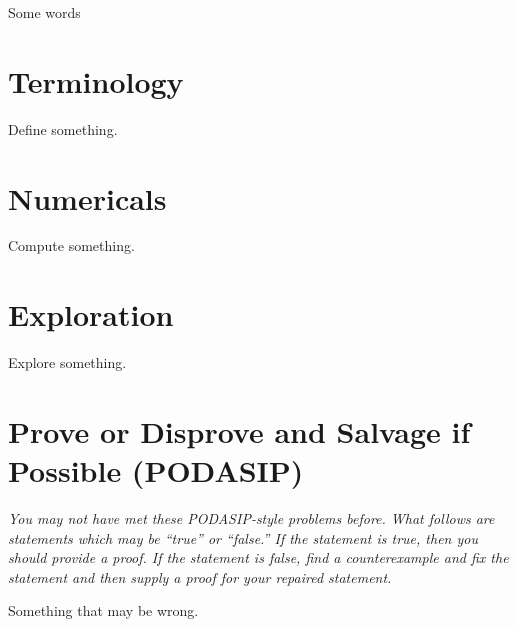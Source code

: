 \documentclass{homework}
\author{Jim Fowler}
\begin{document}
\maketitle

\begin{inspiration}
  Some words
\end{inspiration}

\section{Terminology}

\begin{problem}
  Define something.
\end{problem}

\section{Numericals}

\begin{problem}
  Compute something.
\end{problem}

\section{Exploration}

\begin{problem}
  Explore something.
\end{problem}

\section{Prove or Disprove and Salvage if Possible (PODASIP)}

\textit{You may not have met these PODASIP-style problems before.
  What follows are statements which may be ``true'' or ``false.''  If
  the statement is true, then you should provide a proof.  If the
  statement is false, find a counterexample and fix the statement and
  then supply a proof for your repaired statement.}

\begin{problem}
  Something that may be wrong.
\end{problem}
\end{document}
